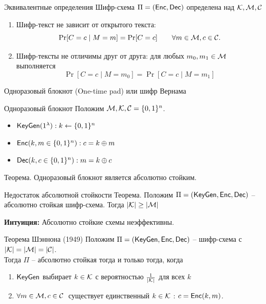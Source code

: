 \documentclass[usenames,dvipsnames,8pt,aspectratio=169]{beamer}
\begin{document}
\begin{frame}{Эквивалентные определения}
\Large
Шифр-схема $\Pi = (\textsf{Enc}, \textsf{Dec})$ определена над $\mathcal{K}, \mathcal{M}, \mathcal{C}$ \\

\begin{enumerate}
	\itemsep 10pt
\item  Шифр-текст не зависит от открытого текста: 
\[
\Pr[C = c \; |\; M =m  ] = \Pr[C = c] \qquad \forall m \in \mathcal{M}, c \in \mathcal{C}.
\]

\item Шифр-тексты не отличимы друг от друга:  для любых $m_0, m_1 \in \mathcal{M}$ выполняется
\[
\Pr[C = c \; | \; M = m_0] = \Pr[C = c \; | \; M = m_1]
\]
\end{enumerate}
\end{frame}

\begin{frame}{Одноразовый блокнот (One-time pad) или шифр Вернама }
\LARGE
\vspace{-40pt}
\begin{block}{Одноразовый блокнот}
Положим $\mathcal{M}, \mathcal{K}, \mathcal{C} = \{0,1\}^n$.
\begin{itemize}
\item $\textsf{KeyGen}(1^{\lambda}): k \leftarrow \{0,1\}^n$ \\[10pt]
\item $\textsf{Enc}(k, m \in \{0,1\}^n): c = k \oplus m$ \\[10pt]
\item $\textsf{Dec}(k, c \in \{0,1\}^n): m = k \oplus c$ \\[10pt]
\end{itemize}
\end{block}

{\color{Orange} Теорема.}
Одноразовый блокнот является абсолютно  стойким.


\end{frame}

\begin{frame}{Недостаток абсолютной стойкости }
\LARGE
{\color{Orange} Теорема.} Положим $\Pi = (\textsf{KeyGen}, \textsf{Enc}, \textsf{Dec})$  -- абсолютно стойкая шифр-схема. Тогда $\left\lvert\mathcal{K}\right\rvert \geq \left\lvert\mathcal{M}\right\rvert$
\vspace{40pt}

\textbf{Интуиция:} Абсолютно стойкие схемы неэффективны.
\end{frame}

\begin{frame}{Теорема Шэннона (1949)}
\LARGE
\vspace{-70pt}
Положим $\Pi = (\textsf{KeyGen}, \textsf{Enc}, \textsf{Dec})$  -- шифр-схема с $\left\lvert\mathcal{K}\right\rvert=\left\lvert\mathcal{M}\right\rvert =\left\lvert\mathcal{C}\right\rvert $. \\[3pt]
Тогда $\Pi$ --  абсолютно стойкая тогда и только тогда, когда\\[6pt]
\begin{enumerate}
\itemsep 7pt
\item $\textsf{KeyGen}$ выбирает $k \in \mathcal{K}$ с вероятностью $\frac{1}{\left\lvert\mathcal{K}\right\rvert}$ для всех $k$
\item $\forall m \in \mathcal{M}, c \in \mathcal{C} \;$ существует единственный $ k \in \mathcal{K}$ : $c = \textsf{Enc}(k, m)$.
\end{enumerate}

\end{frame}
\end{document}
